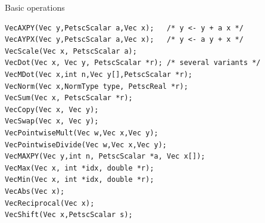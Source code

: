 \begin{numberedframe}{Basic operations}
\small
\begin{lstlisting}
VecAXPY(Vec y,PetscScalar a,Vec x);   /* y <- y + a x */
VecAYPX(Vec y,PetscScalar a,Vec x);   /* y <- a y + x */
VecScale(Vec x, PetscScalar a);
VecDot(Vec x, Vec y, PetscScalar *r); /* several variants */
VecMDot(Vec x,int n,Vec y[],PetscScalar *r);
VecNorm(Vec x,NormType type, PetscReal *r);
VecSum(Vec x, PetscScalar *r);
VecCopy(Vec x, Vec y);
VecSwap(Vec x, Vec y);
VecPointwiseMult(Vec w,Vec x,Vec y);
VecPointwiseDivide(Vec w,Vec x,Vec y);
VecMAXPY(Vec y,int n, PetscScalar *a, Vec x[]);
VecMax(Vec x, int *idx, double *r);
VecMin(Vec x, int *idx, double *r);
VecAbs(Vec x);
VecReciprocal(Vec x);
VecShift(Vec x,PetscScalar s);
\end{lstlisting}
\end{numberedframe}

